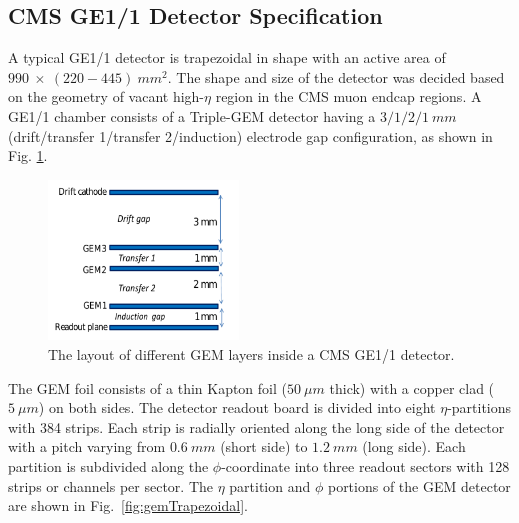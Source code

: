 \subsection{CMS GE1/1 Detector Specification} %
\label{sub:GE1/1_detector_details}
A typical GE1/1 detector is trapezoidal in shape with an active area of $990~\times~(220-445)~mm^2$.
The shape and size of the detector was decided based on the geometry of vacant high-$\eta$ region in the CMS muon endcap regions.
A GE1/1 chamber consists of a Triple-GEM detector having a $3/1/2/1~mm$ (drift/transfer 1/transfer 2/induction) electrode gap configuration, as shown in Fig. \ref{fig:tripple-gem}.
\begin{figure}[!htbp]
    \begin{center}
        \includegraphics[width=0.45\textwidth]{figures/GEM/tripple-gem.png}
        \caption{The layout of different GEM layers inside a CMS GE1/1 detector.}
        \label{fig:tripple-gem}
    \end{center}
\end{figure} 
The GEM foil consists of a thin Kapton foil ($50~\mu m$ thick) with a copper clad ($5~\mu m$) on both sides.
The detector readout board is divided into eight $\eta$-partitions with 384 strips.
Each strip is radially oriented along the long side of the detector with a pitch varying from $0.6~mm$ (short side) to $1.2~mm$ (long side).
Each partition is subdivided along the $\phi$-coordinate into three readout sectors with 128 strips or channels per sector. The $\eta$ partition and $\phi$ portions of the GEM detector are shown in Fig.~\ref{fig:gemTrapezoidal}.

